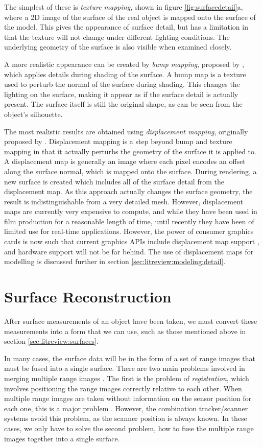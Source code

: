 The simplest of these is {\it texture mapping}, shown in figure \ref{fig:surfacedetail}a, where a 2D image of the surface of the real object is mapped onto the surface of the model. This gives the appearance of surface detail, but has a limitation in that the texture will not change under different lighting conditions. The underlying geometry of the surface is also visible when examined closely.

A more realistic appearance can be created by {\it bump mapping}, proposed by \citet{Blinn78}, which applies details during shading of the surface. A bump map is a texture used to perturb the normal of the surface during shading. This changes the lighting on the surface, making it appear as if the surface detail is actually present. The surface itself is still the original shape, as can be seen from the object's silhouette.

The most realistic results are obtained using {\it displacement mapping}, originally proposed by \citet{Cook84}. Displacement mapping is a step beyond bump and texture mapping in that it actually perturbs the geometry of the surface it is applied to. A displacement map is generally an image where each pixel encodes an offset along the surface normal, which is mapped onto the surface. During rendering, a new surface is created which includes all of the surface detail from the displacement map. As this approach actually changes the surface geometry, the result is indistinguishable from a very detailed mesh. However, displacement maps are currently very expensive to compute, and while they have been used in film production for a reasonable length of time, until recently they have been of limited use for real-time applications. However, the power of consumer graphics cards is now such that current graphics APIs include displacement map support \cite{DirectX9}, and hardware support will not be far behind. The use of displacement maps for modelling is discussed further in section \ref{sec:litreview:modeling:detail}.

\section{\label{sec:litreview:reconstruction}Surface Reconstruction}

After surface measurements of an object have been taken, we must convert these measurements into a form that we can use, such as those mentioned above in section \ref{sec:litreview:surfaces}.

In many cases, the surface data will be in the form of a set of range images that must be fused into a single surface. There are two main problems involved in merging multiple range images \cite{Illingworth98}. The first is the problem of {\it registration}, which involves positioning the range images correctly relative to each other. When multiple range images are taken without information on the sensor position for each one, this is a major problem \cite{Besl92}. However, the combination tracker/scanner systems avoid this problem, as the scanner position is always known. In these cases, we only have to solve the second problem, how to fuse the multiple range images together into a single surface.

